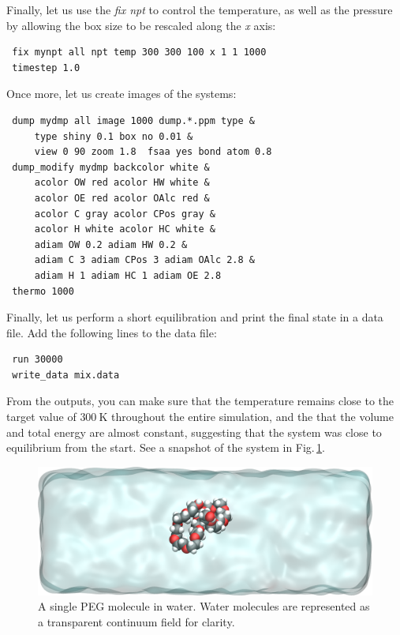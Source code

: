 \documentclass[9pt,tutorial]{livecoms}
\begin{document}
Finally, let us use the \textit{fix npt} to control the temperature, as
well as the pressure by allowing the box size to be rescaled along the \textit{x} axis:
\begin{lstlisting}
 fix mynpt all npt temp 300 300 100 x 1 1 1000
 timestep 1.0
\end{lstlisting}
Once more, let us create images of the systems:
\begin{lstlisting}
 dump mydmp all image 1000 dump.*.ppm type &
     type shiny 0.1 box no 0.01 &
     view 0 90 zoom 1.8  fsaa yes bond atom 0.8
 dump_modify mydmp backcolor white &
     acolor OW red acolor HW white &
     acolor OE red acolor OAlc red &
     acolor C gray acolor CPos gray &
     acolor H white acolor HC white &
     adiam OW 0.2 adiam HW 0.2 &
     adiam C 3 adiam CPos 3 adiam OAlc 2.8 &
     adiam H 1 adiam HC 1 adiam OE 2.8
 thermo 1000
\end{lstlisting}
Finally, let us perform a short equilibration and print the
final state in a data file. Add the following lines to the data file:
\begin{lstlisting}
 run 30000
 write_data mix.data
\end{lstlisting}
From the outputs, you can make sure that the temperature remains close to the
target value of $300~\text{K}$ throughout the entire simulation, and the that
the volume and total energy are almost constant, suggesting
that the system was close to equilibrium from the start. See a snapshot of the
system in Fig.\,\ref{fig:PEG-solvated}.

\begin{figure}
\centering
\includegraphics[width=\linewidth]{PEG-solvated}
\caption{A single PEG molecule in water. Water molecules are represented as a
transparent continuum field for clarity.}
\label{fig:PEG-solvated}
\end{figure}
\end{document}
